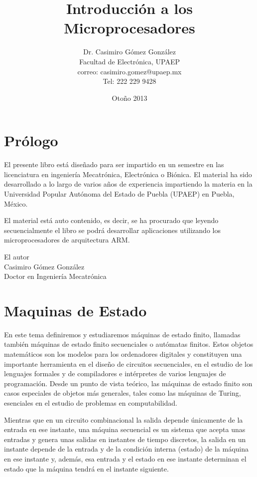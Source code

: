 \documentclass[12pt]{book}
\title{Introducción a los Microprocesadores}
\author{Dr. Casimiro Gómez González\\
	Facultad de Electrónica, UPAEP\\
               correo: casimiro.gomez@upaep.mx\\
               Tel: 222 229 9428}
\date{Otoño 2013}
\theoremstyle{definition}
\theoremstyle{remark}
\theoremstyle{plain}
\begin{document}
\frontmatter
\maketitle


\chapter{Prólogo}

El presente libro está diseñado para ser impartido en un semestre en las licenciatura en ingeniería Mecatrónica, Electrónica o Biónica. El material ha sido desarrollado a lo largo de varios años de experiencia impartiendo la materia en la Universidad Popular Autónoma del Estado de Puebla (UPAEP) en Puebla, México.

El material está auto contenido, es decir, se ha procurado que leyendo secuencialmente el libro se podrá desarrollar aplicaciones utilizando los microprocesadores de arquitectura ARM.



\begin{flushright}

El autor\\
Casimiro Gómez González\\
Doctor en Ingeniería Mecatrónica
\end{flushright}

\tableofcontents

\mainmatter


\chapter{Maquinas de Estado}

En este tema definiremos y estudiaremos máquinas de estado finito, llamadas
también máquinas de estado finito secuenciales o autómatas finitos.
Estos objetos matemáticos son los modelos para los ordenadores digitales
y constituyen una importante herramienta en el diseño de circuitos secuenciales,
en el estudio de los lenguajes formales y de compiladores e
intérpretes de varios lenguajes de programación. Desde un punto de vista
teórico, las máquinas de estado finito son casos especiales de objetos más
generales, tales como las máquinas de Turing, esenciales en el estudio de
problemas en computabilidad.

Mientras que en un circuito combinacional la salida depende únicamente
de la entrada en ese instante, una máquina secuencial es un sistema que
acepta unas entradas y genera unas salidas en instantes de tiempo discretos,
la salida en un instante depende de la entrada y de la condición interna
(estado) de la máquina en ese instante y, además, esa entrada y el estado
en ese instante determinan el estado que la máquina tendrá en el instante
siguiente.
\end{document}
